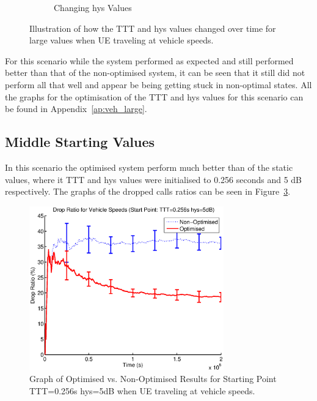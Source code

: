 \begin{figure}[H]
\begin{subfigure}[b]{0.49\textwidth}
                \caption{Changing hys Values}
                \label{fig:veh_high_hys}
        \end{subfigure}
        \caption{Illustration of how the TTT and hys values changed over time for large values when UE traveling at vehicle speeds.}\label{fig:veh_high_ttthys}
\end{figure}
For this scenario while the system performed as expected and still performed better than that of the non-optimised system, it can be seen that it still did not perform all that well and appear be being getting stuck in non-optimal states. All the graphs for the optimisation of the TTT and hys values for this scenario can be found in Appendix~\ref{ap:veh_large}.
\subsection{Middle Starting Values}
In this scenario the optimised system perform much better than of the static values, where it TTT and hys values were initialised to 0.256 seconds and 5 dB respectively. The graphs of the dropped calls ratios can be seen in Figure~\ref{fig:veh_mid_drop}.
\begin{figure}[H]
  \begin{center}
    	  \includegraphics[width=0.75\textwidth]{figures/vehicle_figures/vehmid.eps}
    \end{center}
    \caption{Graph of Optimised vs. Non-Optimised Results for Starting Point TTT=0.256s hys=5dB when UE traveling at vehicle speeds.}
    \label{fig:veh_mid_drop}
\end{figure}
